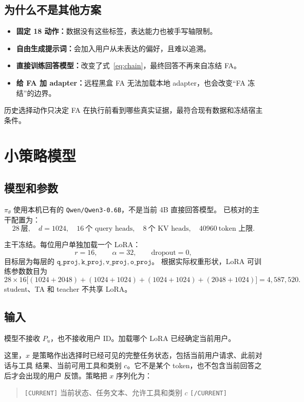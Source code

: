\documentclass[11pt,UTF8,fontset=none]{ctexart}
\newcommand{\policy}{\pi_{\theta}}
\begin{document}
\subsection{为什么不是其他方案}

\begin{itemize}
  \item \textbf{固定 18 动作：}数据没有这些标签，表达能力也被手写轴限制。
  \item \textbf{自由生成提示词：}会加入用户从未表达的偏好，且难以追溯。
  \item \textbf{直接训练回答模型：}改变了式~\eqref{eq:chain}，最终回答不再来自冻结 FA。
  \item \textbf{给 FA 加 adapter：}远程黑盒 FA 无法加载本地 adapter，也会改变“FA 冻结”的边界。
\end{itemize}

历史选择动作只决定 FA 在执行前看到哪些真实证据，最符合现有数据和冻结宿主条件。

\section{小策略模型}

\subsection{模型和参数}

\(\policy\) 使用本机已有的 \texttt{Qwen/Qwen3-0.6B}，不是当前 4B 直接回答模型。
已核对的主干配置为：
\[
  28\ \text{层},\quad
  d=1024,\quad
  16\ \text{个 query heads},\quad
  8\ \text{个 KV heads},\quad
  40960\ \text{token 上限}.
\]

主干冻结。每位用户单独加载一个 LoRA：
\[
  r=16,\qquad
  \alpha=32,\qquad
  \text{dropout}=0,
\]
目标层为每层的
\(\texttt{q\_proj},\texttt{k\_proj},\texttt{v\_proj},\texttt{o\_proj}\)。
根据实际权重形状，LoRA 可训练参数数目为
\[
  28\times16
  \big[(1024+2048)+(1024+1024)
       +(1024+1024)+(2048+1024)\big]
  =4{,}587{,}520.
\]
student、TA 和 teacher 不共享 LoRA。

\subsection{输入}

模型不接收 \(P_u\)，也不接收用户 ID。加载哪个 LoRA 已经确定当前用户。

这里，\(x\) 是策略作出选择时已经可见的完整任务状态，包括当前用户请求、此前对话与工具
结果、当前可用工具和类别 \(c\)。它不是某个 token，也不包含当前回答之后才会出现的用户
反馈。策略把 \(x\) 序列化为：
\begin{quote}
\texttt{[CURRENT]} 当前状态、任务文本、允许工具和类别 \(c\)
\texttt{[/CURRENT]}
\end{quote}
\end{document}
